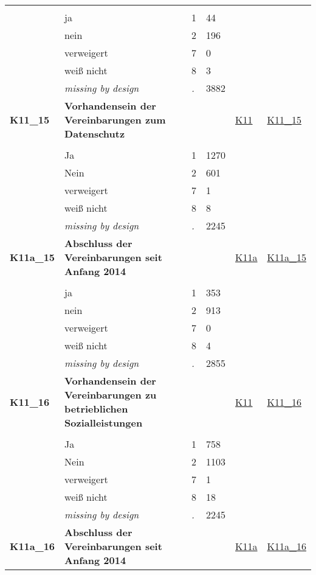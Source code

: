 \begin{longtable}{| L{2.45cm} | L{6cm} | C{1.5cm} | R{1cm} | C{2.25cm} | C{2.25cm} |}
   &  &  &  &  &  \\ 
   & ja & 1 & 44 &  &  \\ 
   & nein & 2 & 196 &  &  \\ 
   & verweigert & 7 & 0 &  &  \\ 
   & weiß nicht & 8 & 3 &  &  \\ 
   & \textit{missing by design} & \textit{.} & 3882 &  &  \\ 
   \midrule
\textbf{K11\_15}\label{var:K11:15} & \textbf{Vorhandensein der Vereinbarungen zum Datenschutz} &  &  & \hyperref[K11]{K11} & \hyperref[var:suf:K11:15]{K11\_15} \\ 
   &  &  &  &  &  \\ 
   & Ja & 1 & 1270 &  &  \\ 
   & Nein & 2 & 601 &  &  \\ 
   & verweigert & 7 & 1 &  &  \\ 
   & weiß nicht & 8 & 8 &  &  \\ 
   & \textit{missing by design} & \textit{.} & 2245 &  &  \\ 
   \midrule
\textbf{K11a\_15}\label{var:K11a:15} & \textbf{Abschluss der Vereinbarungen seit Anfang 2014} &  &  & \hyperref[K11a]{K11a} & \hyperref[var:suf:K11a:15]{K11a\_15} \\ 
   &  &  &  &  &  \\ 
   & ja & 1 & 353 &  &  \\ 
   & nein & 2 & 913 &  &  \\ 
   & verweigert & 7 & 0 &  &  \\ 
   & weiß nicht & 8 & 4 &  &  \\ 
   & \textit{missing by design} & \textit{.} & 2855 &  &  \\ 
   \midrule
\textbf{K11\_16}\label{var:K11:16} & \textbf{Vorhandensein der Vereinbarungen zu betrieblichen Sozialleistungen} &  &  & \hyperref[K11]{K11} & \hyperref[var:suf:K11:16]{K11\_16} \\ 
   &  &  &  &  &  \\ 
   & Ja & 1 & 758 &  &  \\ 
   & Nein & 2 & 1103 &  &  \\ 
   & verweigert & 7 & 1 &  &  \\ 
   & weiß nicht & 8 & 18 &  &  \\ 
   & \textit{missing by design} & \textit{.} & 2245 &  &  \\ 
   \midrule
\textbf{K11a\_16}\label{var:K11a:16} & \textbf{Abschluss der Vereinbarungen seit Anfang 2014} &  &  & \hyperref[K11a]{K11a} & \hyperref[var:suf:K11a:16]{K11a\_16} \\ 

\end{longtable}
